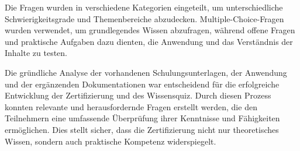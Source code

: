 Die Fragen wurden in verschiedene Kategorien eingeteilt, um unterschiedliche Schwierigkeitsgrade und Themenbereiche abzudecken. Multiple-Choice-Fragen wurden verwendet, um grundlegendes Wissen abzufragen, während offene Fragen und praktische Aufgaben dazu dienten, die Anwendung und das Verständnis der Inhalte zu testen.

Die gründliche Analyse der vorhandenen Schulungsunterlagen, der Anwendung und der ergänzenden Dokumentationen war entscheidend für die erfolgreiche Entwicklung der Zertifizierung und des Wissensquiz. Durch diesen Prozess konnten relevante und herausfordernde Fragen erstellt werden, die den Teilnehmern eine umfassende Überprüfung ihrer Kenntnisse und Fähigkeiten ermöglichen. Dies stellt sicher, dass die Zertifizierung nicht nur theoretisches Wissen, sondern auch praktische Kompetenz widerspiegelt.


